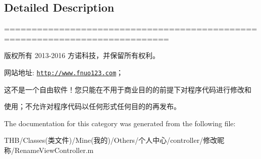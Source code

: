 \subsection{Detailed Description}
============================================================================

版权所有 2013-\/2016 方诺科技，并保留所有权利。

网站地址\+: \href{http://www.fnuo123.com}{\tt http\+://www.\+fnuo123.\+com}； 



这不是一个自由软件！您只能在不用于商业目的的前提下对程序代码进行修改和

使用；不允许对程序代码以任何形式任何目的的再发布。 

 

The documentation for this category was generated from the following file\+:\begin{DoxyCompactItemize}
\item 
T\+H\+B/\+Classes(类文件)/\+Mine(我的)/\+Others/个人中心/controller/修改昵称/Rename\+View\+Controller.\+m\end{DoxyCompactItemize}

